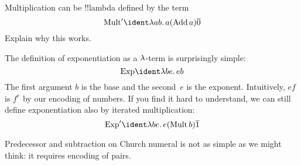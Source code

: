 \documentclass[../../../include/open-logic-section]{subfiles}
\begin{document}
\begin{prob}
Multiplication can be !!{lambda define}d by the term
\[
  \fn{Mult}' \ident \lambd[ab][a (\fn{Add}\, a) \num{0}]
\]
Explain why this works.
\end{prob}

The definition of exponentiation as a $\lambd$-term is
surprisingly simple:
\[
  \fn{Exp} \ident \lambd[be][e b]
\]
The first argument $b$ is the base and the second~$e$ is the exponent.
Intuitively, $e f$ is $f^e$ by our encoding of numbers. If you find it
hard to understand, we can still define exponentiation also by
iterated multiplication:
\[
  \fn{Exp}' \ident \lambd[be][e (\fn{Mult}\, b) \num{1}]
\]

Predecessor and subtraction on Church numeral is not as simple as we
might think: it requires encoding of pairs.
\end{document}
